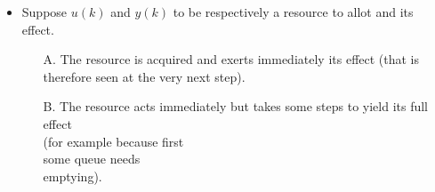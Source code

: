 \begin{frame}
\myPause
 \begin{columns}
   \begin{itemize}[<+-| alert@+>]
   \item Suppose $u(k)$ and $y(k)$ to be respectively a resource to allot and its effect.
         \begin{itemize}[<+-| alert@+>]
         \item[A.] The resource is acquired and exerts immediately its effect (that is therefore
                   seen at the very next step).
         \item[B.] The resource acts immediately but takes some steps to yield its full effect\\
                   (for example because first\\
                   some queue needs\\
                   emptying).
         \end{itemize}
   \end{itemize}
 \end{columns}
\end{frame}

